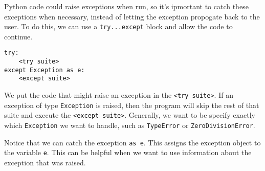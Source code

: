 Python code could raise exceptions when run, so it's ipmortant to catch these exceptions when necessary, instead of letting the exception propogate back to the user. To do this, we can use a \texttt{try...except} block and allow the code to continue.

\begin{lstlisting}
try:
    <try suite>
except Exception as e:
    <except suite>
\end{lstlisting}

We put the code that might raise an exception in the \texttt{<try suite>}. If an exception of type \texttt{Exception} is raised, then the program will skip the rest of that suite and execute the \texttt{<except suite>}. Generally, we want to be specify exactly which \texttt{Exception} we want to handle, such as \texttt{TypeError} or \texttt{ZeroDivisionError}.

Notice that we can catch the exception \texttt{as e}. This assigns the exception object to the variable \texttt{e}. This can be helpful when we want to use information about the exception that was raised.

